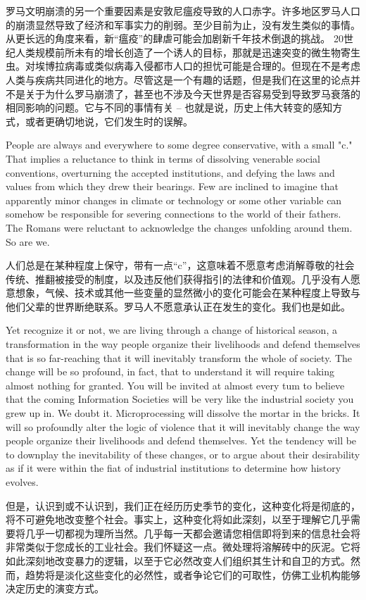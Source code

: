 \begin{paracol}{2}
\switchcolumn
罗马文明崩溃的另一个重要因素是安敦尼瘟疫导致的人口赤字。许多地区罗马人口的崩溃显然导致了经济和军事实力的削弱。至少目前为止，没有发生类似的事情。从更长远的角度来看，新“瘟疫”的肆虐可能会加剧新千年技术倒退的挑战。 20世纪人类规模前所未有的增长创造了一个诱人的目标，那就是迅速突变的微生物寄生虫。对埃博拉病毒或类似病毒入侵都市人口的担忧可能是合理的。但现在不是考虑人类与疾病共同进化的地方。尽管这是一个有趣的话题，但是我们在这里的论点并不是关于为什么罗马崩溃了，甚至也不涉及今天世界是否容易受到导致罗马衰落的相同影响的问题。它与不同的事情有关 -- 也就是说，历史上伟大转变的感知方式，或者更确切地说，它们发生时的误解。


\switchcolumn*
People are always and everywhere to some degree conservative, with a small "c." That implies a reluctance to think in terms of dissolving venerable social conventions, overturning the accepted institutions, and defying the laws and values from which they drew their bearings. Few are inclined to imagine that apparently minor changes in climate or technology or some other variable can somehow be responsible for severing connections to the world of their fathers. The Romans were reluctant to acknowledge the changes unfolding around them. So are we.

\switchcolumn
人们总是在某种程度上保守，带有一点“c”，这意味着不愿意考虑消解尊敬的社会传统、推翻被接受的制度，以及违反他们获得指引的法律和价值观。几乎没有人愿意想象，气候、技术或其他一些变量的显然微小的变化可能会在某种程度上导致与他们父辈的世界断绝联系。罗马人不愿意承认正在发生的变化。我们也是如此。

\switchcolumn*
Yet recognize it or not, we are living through a change of historical season, a transformation in the way people organize their livelihoods and defend themselves that is so far-reaching that it will inevitably transform the whole of society. The change will be so profound, in fact, that to understand it will require taking almost nothing for granted. You will be invited at almost every tum to believe that the coming Information Societies will be very like the industrial society you grew up in. We doubt it. Microprocessing will dissolve the mortar in the bricks. It will so profoundly alter the logic of violence that it will inevitably change the way people organize their livelihoods and defend themselves. Yet the tendency will be to downplay the inevitability of these changes, or to argue about their desirability as if it were within the fiat of industrial institutions to determine how history evolves.

\switchcolumn
但是，认识到或不认识到，我们正在经历历史季节的变化，这种变化将是彻底的，将不可避免地改变整个社会。事实上，这种变化将如此深刻，以至于理解它几乎需要将几乎一切都视为理所当然。几乎每一天都会邀请您相信即将到来的信息社会将非常类似于您成长的工业社会。我们怀疑这一点。微处理将溶解砖中的灰泥。它将如此深刻地改变暴力的逻辑，以至于它必然改变人们组织其生计和自卫的方式。然而，趋势将是淡化这些变化的必然性，或者争论它们的可取性，仿佛工业机构能够决定历史的演变方式。

\end{paracol}

